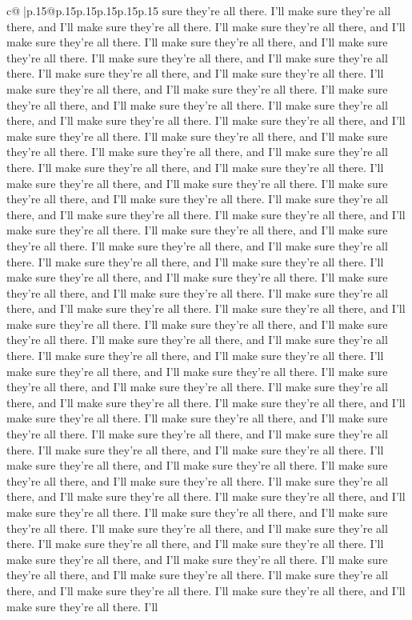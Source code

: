 \documentclass{article}
\begin{document}
{\begin{supertabular}{c@{$\;$}|p{.15\linewidth}@{}p{.15\linewidth}p{.15\linewidth}p{.15\linewidth}p{.15\linewidth}p{.15\linewidth}}
{{{sure they're all there. I'll make sure they're all there, and I'll make sure they're all there. I'll make sure they're all there, and I'll make sure they're all there. I'll make sure they're all there, and I'll make sure they're all there. I'll make sure they're all there, and I'll make sure they're all there. I'll make sure they're all there, and I'll make sure they're all there. I'll make sure they're all there, and I'll make sure they're all there. I'll make sure they're all there, and I'll make sure they're all there. I'll make sure they're all there, and I'll make sure they're all there. I'll make sure they're all there, and I'll make sure they're all there. I'll make sure they're all there, and I'll make sure they're all there. I'll make sure they're all there, and I'll make sure they're all there. I'll make sure they're all there, and I'll make sure they're all there. I'll make sure they're all there, and I'll make sure they're all there. I'll make sure they're all there, and I'll make sure they're all there. I'll make sure they're all there, and I'll make sure they're all there. I'll make sure they're all there, and I'll make sure they're all there. I'll make sure they're all there, and I'll make sure they're all there. I'll make sure they're all there, and I'll make sure they're all there. I'll make sure they're all there, and I'll make sure they're all there. I'll make sure they're all there, and I'll make sure they're all there. I'll make sure they're all there, and I'll make sure they're all there. I'll make sure they're all there, and I'll make sure they're all there. I'll make sure they're all there, and I'll make sure they're all there. I'll make sure they're all there, and I'll make sure they're all there. I'll make sure they're all there, and I'll make sure they're all there. I'll make sure they're all there, and I'll make sure they're all there. I'll make sure they're all there, and I'll make sure they're all there. I'll make sure they're all there, and I'll make sure they're all there. I'll make sure they're all there, and I'll make sure they're all there. I'll make sure they're all there, and I'll make sure they're all there. I'll make sure they're all there, and I'll make sure they're all there. I'll make sure they're all there, and I'll make sure they're all there. I'll make sure they're all there, and I'll make sure they're all there. I'll make sure they're all there, and I'll make sure they're all there. I'll make sure they're all there, and I'll make sure they're all there. I'll make sure they're all there, and I'll make sure they're all there. I'll make sure they're all there, and I'll make sure they're all there. I'll make sure they're all there, and I'll make sure they're all there. I'll make sure they're all there, and I'll make sure they're all there. I'll make sure they're all there, and I'll make sure they're all there. I'll make sure they're all there, and I'll make sure they're all there. I'll make sure they're all there, and I'll make sure they're all there. I'll make sure they're all there, and I'll make sure they're all there. I'll make sure they're all there, and I'll make sure they're all there. I'll }}}
\end{supertabular}}
\end{document}
